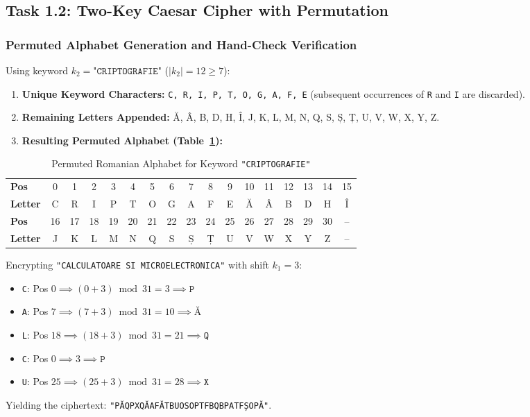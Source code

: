 \documentclass{labreport}
\begin{document}
\subsection{Task 1.2: Two-Key Caesar Cipher with Permutation}

\subsubsection{Permuted Alphabet Generation and Hand-Check Verification}
Using keyword $k_2 = \texttt{"CRIPTOGRAFIE"}$ ($|k_2| = 12 \ge 7$):
\begin{enumerate}[leftmargin=*]
    \item \textbf{Unique Keyword Characters:} \texttt{C, R, I, P, T, O, G, A, F, E} (subsequent occurrences of \texttt{R} and \texttt{I} are discarded).
    \item \textbf{Remaining Letters Appended:} Ă, Â, B, D, H, Î, J, K, L, M, N, Q, S, Ș, Ț, U, V, W, X, Y, Z.
    \item \textbf{Resulting Permuted Alphabet (Table~\ref{tab:permuted_table}):}
\end{enumerate}

\begin{table}[H]
\centering
\small
\caption{Permuted Romanian Alphabet for Keyword \texttt{"CRIPTOGRAFIE"}}
\label{tab:permuted_table}
\begin{tabular}{@{}l*{16}{c}@{}}
\toprule
\textbf{Pos}    & 0 & 1 & 2 & 3 & 4 & 5 & 6 & 7 & 8 & 9 & 10 & 11 & 12 & 13 & 14 & 15 \\
\textbf{Letter} & C & R & I & P & T & O & G & A & F & E & Ă & Â & B & D & H & Î \\
\midrule
\textbf{Pos}    & 16 & 17 & 18 & 19 & 20 & 21 & 22 & 23 & 24 & 25 & 26 & 27 & 28 & 29 & 30 & -- \\
\textbf{Letter} & J & K & L & M & N & Q & S & Ș & Ț & U & V & W & X & Y & Z & -- \\
\bottomrule
\end{tabular}
\end{table}

Encrypting \texttt{"CALCULATOARE SI MICROELECTRONICA"} with shift $k_1 = 3$:
\begin{itemize}[noitemsep, topsep=2pt]
    \item \texttt{C}: Pos $0 \implies (0 + 3) \bmod 31 = 3 \implies \texttt{P}$
    \item \texttt{A}: Pos $7 \implies (7 + 3) \bmod 31 = 10 \implies \texttt{Ă}$
    \item \texttt{L}: Pos $18 \implies (18 + 3) \bmod 31 = 21 \implies \texttt{Q}$
    \item \texttt{C}: Pos $0 \implies 3 \implies \texttt{P}$
    \item \texttt{U}: Pos $25 \implies (25 + 3) \bmod 31 = 28 \implies \texttt{X}$
\end{itemize}
Yielding the ciphertext: \texttt{"PĂQPXQĂAFĂTBUOSOPTFBQBPATFȘOPĂ"}.
\end{document}
